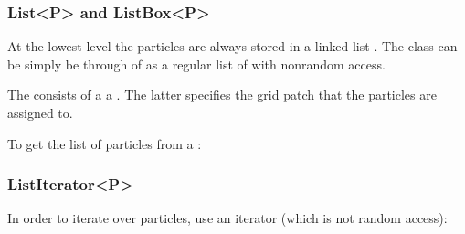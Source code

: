 \documentclass[letterpaper,10pt,english]{sphinxmanual}
\begin{document}
\subsubsection{List\textless{}P\textgreater{} and ListBox\textless{}P\textgreater{}}
\label{\detokenize{Source/Particles:list-p-and-listbox-p}}
\sphinxAtStartPar
At the lowest level the particles are always stored in a linked list .
The class can be simply be through of as a regular list of  with non\sphinxhyphen{}random access.

\sphinxAtStartPar
The  consists of a   a .
The latter specifies the grid patch that the particles are assigned to.

\sphinxAtStartPar
To get the list of particles from a :

\begin{sphinxVerbatim}[commandchars=\\\{\},formatcom=\scriptsize]
 

   
\end{sphinxVerbatim}


\subsubsection{ListIterator\textless{}P\textgreater{}}
\label{\detokenize{Source/Particles:listiterator-p}}
\sphinxAtStartPar
In order to iterate over particles, use an iterator  (which is not random access):

\begin{sphinxVerbatim}[commandchars=\\\{\},formatcom=\scriptsize]
 
    
      

\end{sphinxVerbatim}
\end{document}

